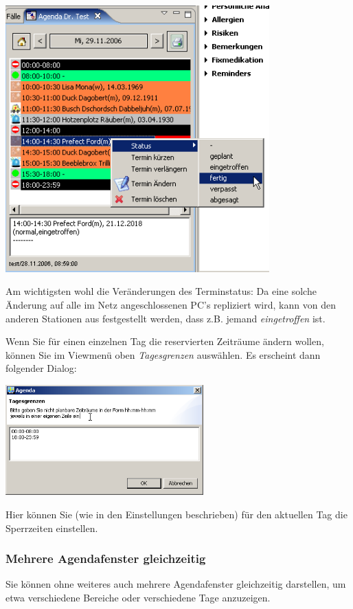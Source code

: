 \includegraphics[width=4in]{images/use5.png}

Am wichtigsten wohl die Veränderungen des Terminstatus: Da eine solche Änderung auf alle im Netz angeschlossenen PC's repliziert wird, kann von den anderen Stationen aus festgestellt werden, dass z.B. jemand \textit{eingetroffen} ist.

Wenn Sie für einen einzelnen Tag die reservierten Zeiträume ändern wollen, können Sie im Viewmenü
oben \textit{Tagesgrenzen} auswählen. Es erscheint dann folgender Dialog:

\includegraphics[width=3in]{images/use3.png}

Hier können Sie (wie in den Einstellungen beschrieben) für den aktuellen Tag die Sperrzeiten einstellen.

\subsubsection{Mehrere Agendafenster gleichzeitig}
Sie können ohne weiteres auch mehrere Agendafenster gleichzeitig darstellen, um etwa verschiedene Bereiche oder verschiedene Tage anzuzeigen.

